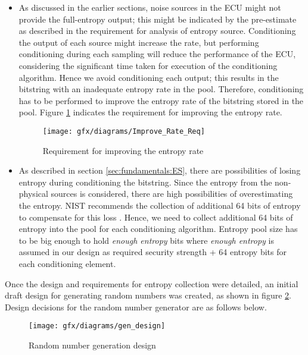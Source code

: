 \begin{itemize}
	\item As discussed in the earlier sections, noise sources in the ECU might not provide the full-entropy output; this might be indicated by the pre-estimate as described in the requirement for analysis of entropy source. Conditioning the output of each source might increase the rate, but performing conditioning during each sampling will reduce the performance of the ECU, considering the significant time taken for execution of the conditioning algorithm. Hence we avoid conditioning each output; this results in the bitstring with an inadequate entropy rate in the pool. Therefore, conditioning has to be performed to improve the entropy rate of the bitstring stored in the pool. Figure \ref{fig:4:6} indicates the requirement for improving the entropy rate. 
	
	\begin{figure}[!h]
		\centering
		\texttt{[image: gfx/diagrams/Improve\_Rate\_Req]}
		\caption{Requirement for improving the entropy rate }
		\label{fig:4:6}
	\end{figure}

	\item As described in section \ref{sec:fundamentals:ES}, there are possibilities of losing entropy during conditioning the bitstring. Since the entropy from the non-physical sources is considered, there are high possibilities of overestimating the entropy. NIST recommends the collection of additional 64 bits of entropy to compensate for this loss \cite{SP90C-2022, FEA-2023}. Hence, we need to collect additional 64 bits of entropy into the pool for each conditioning algorithm. Entropy pool size has to be big enough to hold \textit{enough entropy} bits where \textit{enough entropy} is assumed in our design as required security strength + 64 entropy bits for each conditioning element.
	
\end{itemize}

Once the design and requirements for entropy collection were detailed, an initial draft design for generating random numbers was created, as shown in figure \ref{fig:4:7}. Design decisions for the random number generator are as follows below. 

\begin{figure}[!h]
	\centering
	\texttt{[image: gfx/diagrams/gen\_design]}
	\caption{Random number generation design}
	\label{fig:4:7}
\end{figure}

